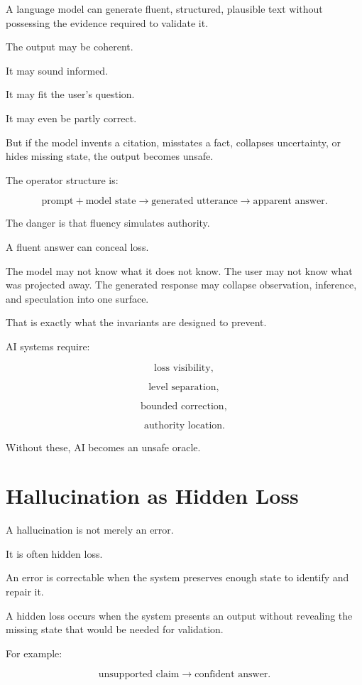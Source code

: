 \documentclass[11pt]{book}
\begin{document}
A language model can generate fluent, structured, plausible text without possessing the evidence required to validate it.

The output may be coherent.

It may sound informed.

It may fit the user's question.

It may even be partly correct.

But if the model invents a citation, misstates a fact, collapses uncertainty, or hides missing state, the output becomes unsafe.

The operator structure is:

\[
\text{prompt}
+
\text{model state}
\rightarrow
\text{generated utterance}
\rightarrow
\text{apparent answer}.
\]

The danger is that fluency simulates authority.

A fluent answer can conceal loss.

The model may not know what it does not know. The user may not know what was projected away. The generated response may collapse observation, inference, and speculation into one surface.

That is exactly what the invariants are designed to prevent.

AI systems require:

\[
\text{loss visibility},
\]

\[
\text{level separation},
\]

\[
\text{bounded correction},
\]

\[
\text{authority location}.
\]

Without these, AI becomes an unsafe oracle.

\section{Hallucination as Hidden Loss}

A hallucination is not merely an error.

It is often hidden loss.

An error is correctable when the system preserves enough state to identify and repair it.

A hidden loss occurs when the system presents an output without revealing the missing state that would be needed for validation.

For example:

\[
\text{unsupported claim}
\rightarrow
\text{confident answer}.
\]
\end{document}
